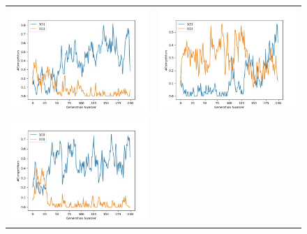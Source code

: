 \documentclass{article}
\begin{document}
\begin{figure}[H]
	\centering
	\begin{adjustbox}{width=0.6\paperwidth}
		\begin{tabular}{c c}
			\includegraphics{Codes/Problem_2 Construction_1/Comp_1.jpg} & \includegraphics{Codes/Problem_2 Construction_1/Comp_2.jpg} \\
			\includegraphics{Codes/Problem_2 Construction_1/Comp_3.jpg}&

\end{tabular}
\end{adjustbox}
\end{figure}
\end{document}
